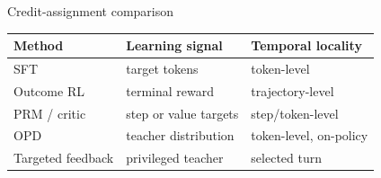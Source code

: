 \begin{frame}{Credit-assignment comparison}
  \begin{table}
    \centering
    \small
    \begin{tabular}{lll}
      \toprule
      Method & Learning signal & Temporal locality \\
      \midrule
      SFT & target tokens & token-level \\
      Outcome RL & terminal reward & trajectory-level \\
      PRM / critic & step or value targets & step/token-level \\
      OPD & teacher distribution & token-level, on-policy \\
      Targeted feedback & privileged teacher & selected turn \\
      \bottomrule
    \end{tabular}
  \end{table}
\end{frame}
